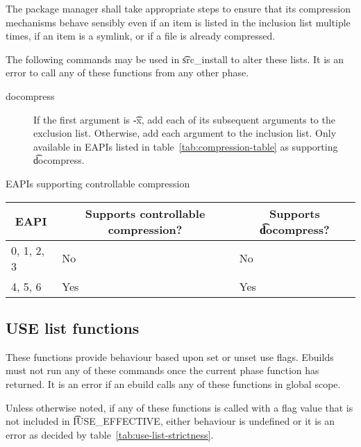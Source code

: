 The package manager shall take appropriate steps to ensure that its compression mechanisms behave
sensibly even if an item is listed in the inclusion list multiple times, if an item is a symlink,
or if a file is already compressed.

The following commands may be used in \t{src_install} to alter these lists. It is an error to call
any of these functions from any other phase.

\begin{description}
\item[docompress] If the first argument is \t{-x}, add each of its subsequent arguments to the
exclusion list. Otherwise, add each argument to the inclusion list. Only available in EAPIs listed
in table~\ref{tab:compression-table} as supporting \t{docompress}.
\end{description}

\begin{centertable}{EAPIs supporting controllable compression}
    \label{tab:compression-table}
    \begin{tabular}{lll}
      \toprule
      \multicolumn{1}{c}{\textbf{EAPI}} &
      \multicolumn{1}{c}{\textbf{Supports controllable compression?}} &
      \multicolumn{1}{c}{\textbf{Supports \t{docompress}?}} \\
      \midrule
      0, 1, 2, 3        & No  & No  \\
      4, 5, 6           & Yes & Yes \\
      \bottomrule
    \end{tabular}
\end{centertable}

\subsection{USE list functions}
These functions provide behaviour based upon set or unset use flags. Ebuilds must not run any of
these commands once the current phase function has returned. It is an error if an ebuild calls any
of these functions in global scope.

Unless otherwise noted, if any of these functions is called with a flag value that is not included
in \t{IUSE_EFFECTIVE}, either behaviour is undefined or it is an error as decided by
table~\ref{tab:use-list-strictness}.

